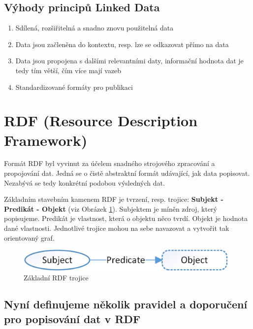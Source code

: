 \subsection*{Výhody principů Linked Data}

\begin{enumerate}
\item Sdílená, rozšiřitelná a snadno znovu použitelná data   
\item Data jsou začleněna do kontextu, resp. lze se odkazovat přímo na data
\item Data jsou propojena s dalšími relevantními daty, informační hodnota dat je tedy tím větší, čím více mají vazeb
\item Standardizované formáty pro publikaci
\end{enumerate}

\newpage

\section{RDF (Resource Description Framework)}
\label{sec:RDF}

Formát RDF byl vyvinut za účelem snadného strojového zpracování a propojování dat. Jedná se o čistě abstraktní formát udávající, jak data popisovat. Nezabývá se tedy konkrétní podobou výsledných dat. 

Základním stavebním kamenem RDF je tvrzení, resp. trojice: \textbf{Subjekt - Predikát - Objekt} (viz Obrázek \ref{obr:rdf_basic}). Subjektem je míněn zdroj, který popisujeme. Predikát je vlastnost, která o objektu něco tvrdí. Objekt je hodnota dané vlastnosti. Jednotlivé trojice mohou na sebe navazovat a vytvořit tak orientovaný graf.

\begin{figure}[h]
\centerline{\includegraphics[width=110mm]{img/rdf_basic.eps}}
\caption{Základní RDF trojice}
\label{obr:rdf_basic}
\end{figure}

\subsection*{Nyní definujeme několik pravidel a doporučení pro popisování dat v RDF}

